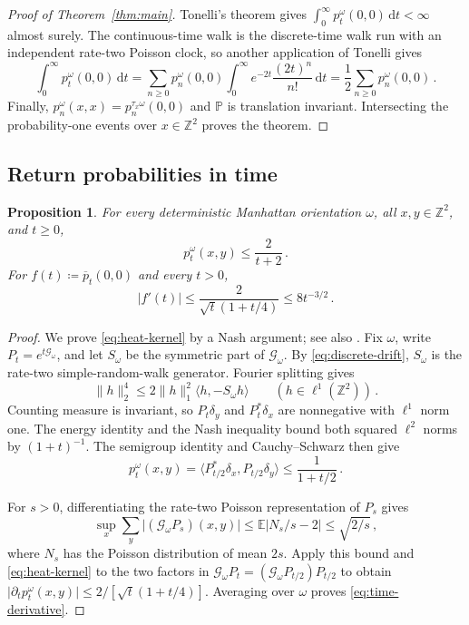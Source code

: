 \documentclass[11pt]{amsart}
\theoremstyle{plain}
\newtheorem{proposition}[theorem]{Proposition}
\theoremstyle{definition}
\newcommand{\Z}{\mathbb Z}
\newcommand{\E}{\mathbb E}
\renewcommand{\P}{\mathbb P}
\newcommand{\1}{\mathbf 1}
\newcommand{\ip}[2]{\langle #1,#2\rangle}
\newcommand{\norm}[1]{\lVert #1\rVert}
\newcommand{\abs}[1]{\lvert #1\rvert}
\newcommand{\dd}{\,\mathrm d}
\begin{document}
	\begin{proof}[Proof of Theorem~\ref{thm:main}]
		Tonelli's theorem gives
		$\int_0^\infty p_t^\omega(0,0)\dd t<\infty$ almost surely.
		The continuous-time walk is the discrete-time walk run with an independent
		rate-two Poisson clock, so another application of Tonelli gives
		\[
		\int_0^\infty p_t^\omega(0,0)\dd t
		=\sum_{n\geq0}p_n^\omega(0,0)
		\int_0^\infty e^{-2t}\frac{(2t)^n}{n!}\dd t
		=\frac12\sum_{n\geq0}p_n^\omega(0,0)\, .
		\]
		Finally, $p_n^\omega(x,x)=p_n^{\tau_x\omega}(0,0)$ and $\P$ is
		translation invariant.  Intersecting the probability-one events over
		$x\in\Z^2$ proves the theorem.
	\end{proof}
	
	\subsection{Return probabilities in time}\label{ssec:time}
	
	\begin{proposition}\label{prop:time}
		For every deterministic Manhattan orientation $\omega$, all $x,y\in\Z^2$,
		and $t\geq0$,
		\begin{equation}\label{eq:heat-kernel}
			p_t^\omega(x,y)\leq\frac2{t+2}\, .
		\end{equation}
		For $f(t)\coloneqq\overline p_t(0,0)$ and every $t>0$,
		\begin{equation}\label{eq:time-derivative}
			\abs{f'(t)}\leq\frac2{\sqrt t(1+t/4)}\leq8t^{-3/2}\, .
		\end{equation}
	\end{proposition}
	
	\begin{proof}
		We prove \eqref{eq:heat-kernel} by a Nash argument; see also
		\citet*[Proposition~3]{KT17}.  Fix $\omega$, write
		$P_t=e^{t\mathcal G_\omega}$, and let $S_\omega$ be the symmetric part
		of $\mathcal G_\omega$.  By \eqref{eq:discrete-drift}, $S_\omega$ is the
		rate-two simple-random-walk generator.  Fourier splitting gives
		\[
		\norm h_2^4\leq2\norm h_1^2\ip h{-S_\omega h}
		\qquad(h\in\ell^1(\Z^2))\, .
		\]
		Counting measure is invariant, so $P_t\delta_y$ and $P_t^*\delta_x$
		are nonnegative with $\ell^1$ norm one.  The energy identity and the
		Nash inequality bound both squared $\ell^2$ norms by $(1+t)^{-1}$.
		The semigroup identity and Cauchy--Schwarz then give
		\[
		p_t^\omega(x,y)
		=\ip{P_{t/2}^*\delta_x}{P_{t/2}\delta_y}
		\leq\frac1{1+t/2}\, .
		\]

		For $s>0$, differentiating the rate-two Poisson representation of $P_s$
		gives
		\[
		\sup_x\sum_y\abs{(\mathcal G_\omega P_s)(x,y)}
		\leq\E\abs{N_s/s-2}\leq\sqrt{2/s}\, ,
		\]
		where $N_s$ has the Poisson distribution of mean $2s$.
		Apply this bound and \eqref{eq:heat-kernel} to the two factors in
		$\mathcal G_\omega P_t=(\mathcal G_\omega P_{t/2})P_{t/2}$ to obtain
		$\abs{\partial_t p_t^\omega(x,y)}\leq2/[\sqrt t(1+t/4)]$.
		Averaging over $\omega$ proves \eqref{eq:time-derivative}.
	\end{proof}
	
\end{document}
